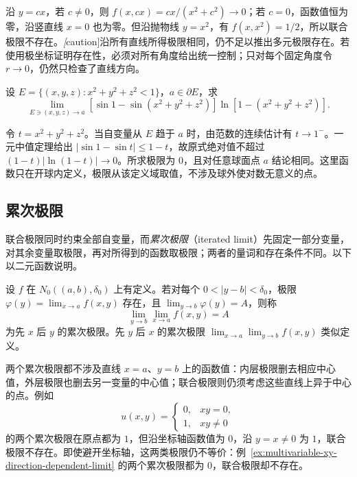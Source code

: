 \begin{solve}
沿 $y=cx$，若 $c\neq0$，则 $f(x,cx)=cx/(x^2+c^2)\to0$；若 $c=0$，函数值恒为零，沿竖直线 $x=0$ 也为零。但沿抛物线 $y=x^2$，有 $f(x,x^2)=1/2$，所以联合极限不存在。\emph[caution]{沿所有直线所得极限相同，仍不足以推出多元极限存在。}若使用极坐标证明存在性，必须对所有角度给出统一控制；只对每个固定角度令 $r\to0$，仍然只检查了直线方向。
\end{solve}

\begin{example}
\label{ex:ball-boundary-radial-logarithm-limit}
设 $E=\{(x,y,z):x^2+y^2+z^2<1\}$，$a\in\partial E$，求
\[
    \lim_{E\ni(x,y,z)\to a}
    [\sin1-\sin(x^2+y^2+z^2)]\ln[1-(x^2+y^2+z^2)].
\]
\end{example}

\begin{solve}
令 $t=x^2+y^2+z^2$。当自变量从 $E$ 趋于 $a$ 时，由范数的连续估计有 $t\to1^-$。一元中值定理给出 $|\sin1-\sin t|\leq1-t$，故原式绝对值不超过 $(1-t)|\ln(1-t)|\to0$。所求极限为 $0$，且对任意球面点 $a$ 结论相同。这里函数只在开球内定义，极限从该定义域取值，不涉及球外使对数无意义的点。
\end{solve}

\subsection{累次极限}
\label{subsec:iterated-limits}

联合极限同时约束全部自变量，而\emph{累次极限}（iterated limit）先固定一部分变量，对其余变量取极限，再对所得到的函数取极限；两者的量词和存在条件不同。以下以二元函数说明。

\begin{definition}
\label{def:iterated-multivariable-limits}
设 $f$ 在 $N_0((a,b),\delta_0)$ 上有定义。若对每个 $0<|y-b|<\delta_0$，极限 $\varphi(y)=\lim_{x\to a}f(x,y)$ 存在，且 $\lim_{y\to b}\varphi(y)=A$，则称
\[
    \lim_{y\to b}\lim_{x\to a}f(x,y)=A
\]
为先 $x$ 后 $y$ 的累次极限。先 $y$ 后 $x$ 的累次极限 $\lim_{x\to a}\lim_{y\to b}f(x,y)$ 类似定义。
\end{definition}

两个累次极限都不涉及直线 $x=a$、$y=b$ 上的函数值：内层极限删去相应中心值，外层极限也删去另一变量的中心值；联合极限则仍须考虑这些直线上异于中心的点。例如
\[
    u(x,y)=\begin{cases}0,&xy=0,\\1,&xy\neq0\end{cases}
\]
的两个累次极限在原点都为 $1$，但沿坐标轴函数值为 $0$，沿 $y=x\neq0$ 为 $1$，联合极限不存在。即使避开坐标轴，这两类极限仍不等价：例~\ref{ex:multivariable-xy-direction-dependent-limit} 的两个累次极限都为 $0$，联合极限却不存在。

